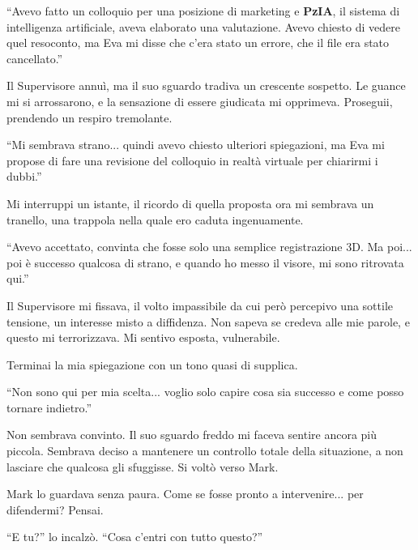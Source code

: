 \begin{dialogue}
 \enquote{Avevo fatto un colloquio per una posizione di marketing e \textbf{PzIA}, il sistema di intelligenza artificiale, aveva elaborato una valutazione. Avevo chiesto di vedere quel resoconto, ma Eva mi disse che c'era stato un errore, che il file era stato cancellato.}
\end{dialogue}

Il Supervisore annuì, ma il suo sguardo tradiva un crescente sospetto. Le guance mi si arrossarono, e la sensazione di essere giudicata mi opprimeva. Proseguii, prendendo un respiro tremolante.

\begin{dialogue}
 \enquote{Mi sembrava strano... quindi avevo chiesto ulteriori spiegazioni, ma Eva mi propose di fare una revisione del colloquio in realtà virtuale per chiarirmi i dubbi.}
\end{dialogue}

Mi interruppi un istante, il ricordo di quella proposta ora mi sembrava un tranello, una trappola nella quale ero caduta ingenuamente.

\begin{dialogue}
 \enquote{Avevo accettato, convinta che fosse solo una semplice registrazione 3D. Ma poi... poi è successo qualcosa di strano, e quando ho messo il visore, mi sono ritrovata qui.}
\end{dialogue}

Il Supervisore mi fissava, il volto impassibile da cui però percepivo una sottile tensione, un interesse misto a diffidenza. Non sapeva se credeva alle mie parole, e questo mi terrorizzava. Mi sentivo esposta, vulnerabile.

Terminai la mia spiegazione con un tono quasi di supplica.

\begin{dialogue}
 \enquote{Non sono qui per mia scelta... voglio solo capire cosa sia successo e come posso tornare indietro.}
\end{dialogue}

Non sembrava convinto. Il suo sguardo freddo mi faceva sentire ancora più piccola. Sembrava deciso a mantenere un controllo totale della situazione, a non lasciare che qualcosa gli sfuggisse. Si voltò verso Mark.

Mark lo guardava senza paura.  Come se fosse pronto a intervenire... per difendermi? Pensai.

\begin{dialogue}
 \enquote{E tu?} lo incalzò. \enquote{Cosa c'entri con tutto questo?}
\end{dialogue}

